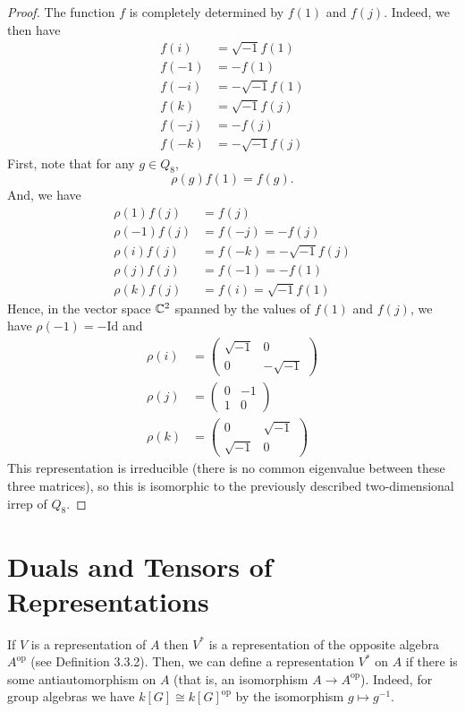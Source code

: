 \documentclass[oneside]{scrbook}
\begin{document}
\begin{proof}
The function $f$ is completely determined by $f(1)$ and $f(j)$. Indeed, we then have
\begin{align*}
    f(i) &= \sqrt{-1}f(1)\\
    f(-1) &= -f(1)\\
    f(-i) &= -\sqrt{-1}f(1)\\
    f(k) &= \sqrt{-1}f(j)\\
    f(-j) &= -f(j)\\
    f(-k) &= -\sqrt{-1}f(j)
\end{align*}
First, note that for any $g\in Q_8$, 
\[\rho(g)f(1)=f(g).\]
And, we have
\begin{align*}
    \rho(1) f(j) &= f(j)\\
    \rho(-1) f(j) &= f(-j) = -f(j)\\
    \rho(i) f(j) &= f(-k)=-\sqrt{-1}f(j)\\
    \rho(j) f(j) &= f(-1) = -f(1)\\
    \rho(k) f(j) &= f(i) =\sqrt{-1}f(1)
\end{align*}
Hence, in the vector space $\mathbb C^2$ spanned by the values of $f(1)$ and $f(j)$, we have $\rho(-1)=-\text{Id}$ and 
\begin{align*}
    \rho(i) &= \begin{pmatrix}
    \sqrt{-1} & 0\\
    0 & -\sqrt{-1}\end{pmatrix}\\
    \rho(j) &= \begin{pmatrix}
    0 & -1\\
    1 & 0\end{pmatrix}\\
    \rho(k) &= \begin{pmatrix}
    0 & \sqrt{-1}\\
    \sqrt{-1} & 0\end{pmatrix}
\end{align*}
This representation is irreducible (there is no common eigenvalue between these three matrices), so this is isomorphic to the previously described two-dimensional irrep of $Q_8$. 
\end{proof}

\section{Duals and Tensors of Representations}
If $V$ is a representation of $A$ then $V^*$ is a representation of the opposite algebra $A^{\text{op}}$ (see Definition 3.3.2). Then, we can define a representation $V^*$ on $A$ if there is some antiautomorphism on $A$ (that is, an isomorphism $A\to A^{\text{op}}$). Indeed, for group algebras we have $k[G]\cong k[G]^{\text{op}}$ by the isomorphism $g\mapsto g^{-1}$.
\end{document}
